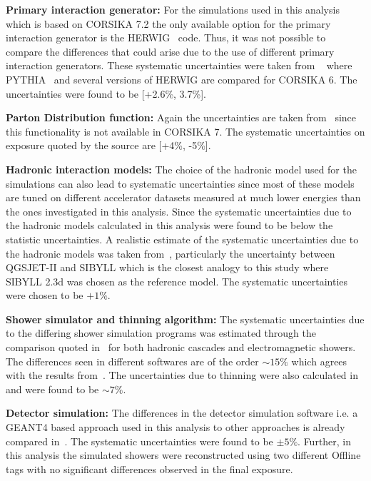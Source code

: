 \begin{description}
  \item \textbf{Primary interaction generator:} For the simulations used in this analysis which is based on CORSIKA 7.2 the only available option for the primary interaction generator is the HERWIG~\cite{Corcella:2000bw} code. Thus, it was not possible to compare the differences that could arise due to the use of different primary interaction generators. These systematic uncertainties were taken from ~\cite{gap_systematics} where PYTHIA~\cite{Sjostrand:2006za} and several versions of HERWIG are compared for CORSIKA 6. The uncertainties were found to be [+2.6\%, 3.7\%]. 
  \item \textbf{Parton Distribution function:} Again the uncertainties are taken from~\cite{gap_systematics} since this functionality is not available in CORSIKA 7. The systematic uncertainties on exposure quoted by the source are [+4\%, -5\%].
  \item \textbf{Hadronic interaction models:} The choice of the hadronic model used for the simulations can also lead to systematic uncertainties since most of these models are tuned on different accelerator datasets measured at much lower energies than the ones investigated in this analysis. Since the systematic uncertainties due to the hadronic models calculated in this analysis were found to be below the statistic uncertainties. A realistic estimate of the systematic uncertainties due to the hadronic models was taken from~\cite{gap_systematics}, particularly the uncertainty between QGSJET-II and SIBYLL which is the closest analogy to this study where SIBYLL 2.3d was chosen as the reference model. The systematic uncertainties were chosen to be $+ 1\%$.
  \item \textbf{Shower simulator and thinning algorithm:} The systematic uncertainties due to the differing shower simulation programs was estimated through the comparison quoted in~\cite{Huege:2022xbo} for both hadronic cascades and electromagnetic showers. The differences seen in different softwares are of the order $\sim 15\%$ which agrees with the results from~\cite{gap_systematics}. The uncertainties due to thinning were also calculated in~\cite{gap_systematics} and were found to be $\sim 7\%$.
  \item \textbf{Detector simulation:} The differences in the detector simulation software i.e. a GEANT4 based approach used in this analysis to other approaches is already compared in~\cite{gap_note_det_systematics}. The systematic uncertainties were found to be $\pm 5\%$. Further, in this analysis the simulated showers were reconstructed using two different Offline tags with no significant differences observed in the final exposure. 

\end{description}
